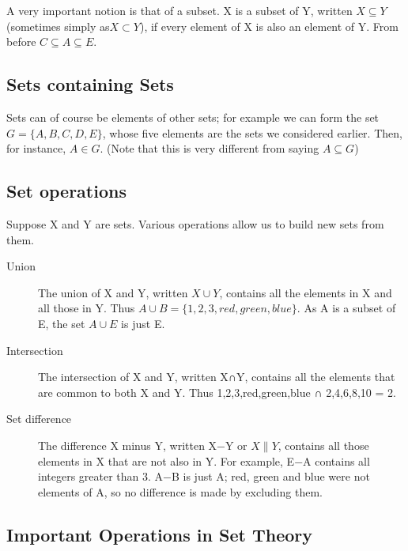 \documentclass[]{report}
\begin{document}
A very important notion is that of a subset. X is a subset of Y, written $X \subseteq Y$ (sometimes simply as$X \subset Y$), if every element of X is also an element of Y. From before $C\subseteq A \subseteq E$.
\subsection{Sets containing Sets}


Sets can of course be elements of other sets; for example we can form the set $G = \{A,B,C,D,E\}$, whose five elements are the sets we considered earlier. Then, for instance, $A\in G$. (Note that this is very different from saying $A\subseteq G$)


\subsection{Set operations}

Suppose X and Y are sets. Various operations allow us to build new sets from them.

\begin{description}
	\item[Union]
	The union of X and Y, written $X\cup Y$, contains all the elements in X and all those in Y. Thus $A \cup B = \{1, 2, 3, red, green, blue\}$. As A is a subset of E, the set $A \cup E$ is just E.
	
	\item[Intersection]
	
	The intersection of X and Y, written X∩Y, contains all the elements that are common to both X and Y. Thus {1,2,3,red,green,blue} ∩ {2,4,6,8,10} = {2}.
	
	\item[Set difference]
	
	The difference X minus Y, written X−Y or $X\|Y$, contains all those elements in X that are not also in Y. For example, E−A contains all integers greater than 3. A−B is just A; red, green and blue were not elements of A, so no difference is made by excluding them.
\end{description}


\subsection{Important Operations in Set Theory}
\end{document}
